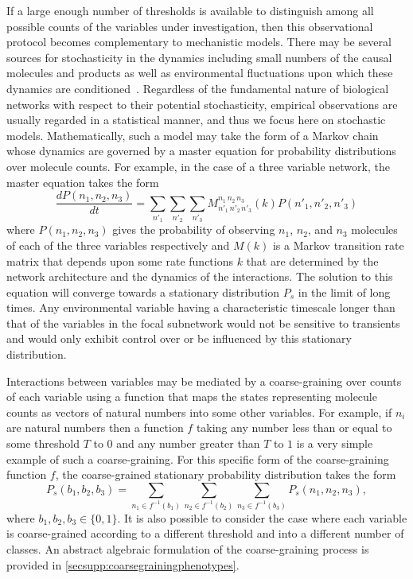 If a large enough number of thresholds is available to distinguish among all possible counts of the variables under investigation, then this observational protocol becomes complementary to mechanistic models.  There may be several sources for stochasticity in the dynamics including small numbers of the causal molecules and products as well as environmental fluctuations upon which these dynamics are conditioned~\cite{Swain2002,Paulsson2004,Thattai2004,Acar2008a,Lestas2010,Munsky2012,Chalancon2012,Neuert2013,Sanchez2013}. Regardless of the fundamental nature of biological networks with respect to their potential stochasticity, empirical observations are usually regarded in a statistical manner, and thus we focus here on stochastic models.
Mathematically, such a model may take the form of a Markov chain whose dynamics are governed by a master equation for probability distributions over molecule counts. For example, in the case of a three variable network, the master equation takes the form
$$
\frac{dP(n_1,n_2,n_3)}{dt} = \sum_{n'_1}\sum_{n'_2}\sum_{n'_3} M^{n_1\,n_2\,n_3}_{n'_1\,n'_2\,n'_3}(k) P(n'_1,n'_2,n'_3)
$$
where $P(n_1,n_2,n_3)$ gives the probability of observing $n_1$, $n_2$, and $n_3$ molecules of each of the three variables respectively and $M(k)$ is a Markov transition rate matrix that depends upon some rate functions $k$ that are determined by the network architecture and the dynamics of the interactions.  The solution to this equation will converge towards a stationary distribution $P_s$ in the limit of long times. Any environmental variable having a characteristic timescale longer than that of the variables in the focal subnetwork would not be sensitive to transients and would only exhibit control over or be influenced by this stationary distribution.

Interactions between variables may be mediated by a coarse-graining over counts of each variable using a function that maps the states representing molecule counts as vectors of natural numbers into some other variables. For example, if $n_i$ are natural numbers
then a function $f$ taking any number less than or equal to some threshold $T$ to $0$ and any number greater than $T$ to $1$ is a very simple example of such a coarse-graining. For this specific form of the coarse-graining function $f$, the coarse-grained stationary probability distribution takes the form
$$
P_s(b_1,b_2,b_3) = \sum_{n_1 \in f^{-1}(b_1)}\sum_{n_2 \in f^{-1}(b_2)}\sum_{n_3 \in f^{-1}(b_3)} P_s(n_1,n_2,n_3),
$$
where $b_1,b_2,b_3 \in \{ 0,1 \}$. It is also possible to consider the case where each variable is coarse-grained according to a different threshold and into a different number of classes. An abstract algebraic formulation of the coarse-graining process is provided in  \ref{secsupp:coarsegrainingphenotypes}.

